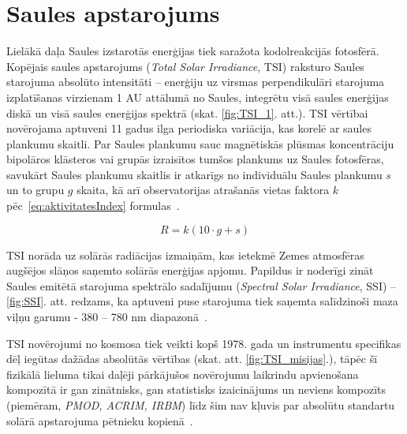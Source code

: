 \section{Saules apstarojums}

Lielākā daļa Saules izstarotās enerģijas tiek saražota kodolreakcijās fotosfērā. 
Kopējais saules apstarojums (\textit{Total Solar Irradiance}, TSI) raksturo Saules starojuma absolūto intensitāti -- enerģiju uz virsmas perpendikulāri starojuma izplatīšanas virzienam 1 AU attālumā no Saules, integrētu visā saules enerģijas diskā un visā saules enerģijas spektrā (skat. \ref{fig:TSI_1}. att.). TSI vērtībai novērojama aptuveni 11 gadus ilga periodiska variācija, kas korelē ar saules plankumu skaitli. Par Saules plankumu sauc magnētiskās plūsmas koncentrāciju bipolāros klāsteros vai grupās izraisītos tumšos plankums uz Saules fotosfēras, savukārt Saules plankumu skaitlis ir atkarīgs no individuālu Saules plankumu $s$ un to grupu $g$ skaita, kā arī observatorijas atrašanās vietas faktora $k$
pēc~\ref{eq:aktivitatesIndex} formulas~\cite{ThermalProcesses}.

\begin{equation}
\label{eq:aktivitatesIndex}
R = k(10 \cdot g + s)
\end{equation}

TSI norāda uz solārās radiācijas izmaiņām, kas ietekmē Zemes atmosfēras augšējos slāņos saņemto solārās enerģijas apjomu. Papildus ir noderīgi zināt Saules emitētā starojuma spektrālo sadalījumu (\textit{Spectral Solar Irradiance}, SSI) -- \ref{fig:SSI}. att. redzams, ka aptuveni puse starojuma tiek saņemta salīdzinoši maza viļņu garumu - 380 -- 780 nm diapazonā~\cite{ThermalProcesses}.

TSI novērojumi no kosmosa tiek veikti kopš 1978. gada un instrumentu specifikas dēļ iegūtas dažādas absolūtās vērtības (skat. att. \ref{fig:TSI_misijas}.), tāpēc šī fizikālā lieluma tikai daļēji pārkājušos novērojumu laikrindu apvienošana kompozītā ir gan zinātnisks, gan statistisks izaicinājums un neviens kompozīts (piemēram, \emph{PMOD, ACRIM, IRBM}) līdz šim nav kļuvis par absolūtu standartu solārā apstarojuma pētnieku kopienā~\cite{Frohlich2012}.

